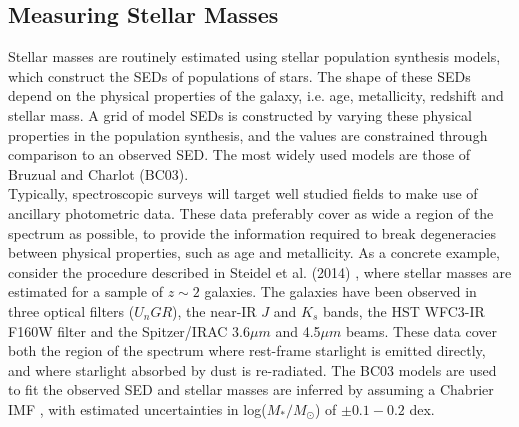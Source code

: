 \documentclass{literature}
\begin{document}
\subsection{Measuring Stellar Masses}\label{subsec:measuring_mass}
Stellar masses are routinely estimated using stellar population synthesis models, which construct the SEDs of populations of stars. The shape of these SEDs depend on the physical properties of the galaxy, i.e. age, metallicity, redshift and stellar mass. A grid of model SEDs is constructed by varying these physical properties in the population synthesis, and the values are constrained through comparison to an observed SED. The most widely used models are those of Bruzual and Charlot \citep{Bruzual2003} (BC03). \\      
Typically, spectroscopic surveys will target well studied fields to make use of ancillary photometric data. These data preferably cover as wide a region of the spectrum as possible, to provide the information required to break degeneracies between physical properties, such as age and metallicity. As a concrete example, consider the procedure described in Steidel et al. (2014) \citep{Steidel2014}, where stellar masses are estimated for a sample of $z \sim 2$ galaxies. The galaxies have been observed in three optical filters (\textit{$U_{n}GR$}), the near-IR  $ J $ and $ K_{s}$ bands, the HST WFC3-IR F160W filter and the Spitzer/IRAC 3.6$\mu m$ and 4.5$\mu m$ beams. These data cover both the region of the spectrum where rest-frame starlight is emitted directly, and where starlight absorbed by dust is re-radiated. The BC03 models are used to fit the observed SED and stellar masses are inferred by assuming a Chabrier IMF \citep{Chabrier2003}, with estimated uncertainties in log($M_{*} /M_{\odot}$) of $\pm 0.1-0.2 $ dex.    
\end{document}

